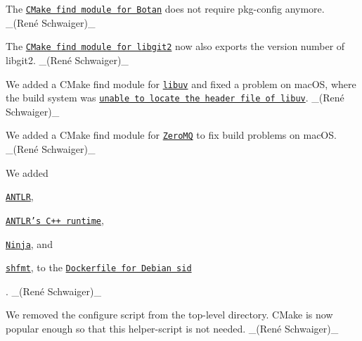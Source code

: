 \begin{DoxyItemize}
\item The \href{https://master.libelektra.org/scripts/cmake/Modules/FindLibgcrypt.cmake}{\tt C\+Make find module for Botan} does not require {\ttfamily pkg-\/config} anymore. \+\_\+(René Schwaiger)\+\_\+
\item The \href{https://master.libelektra.org/scripts/cmake/Modules/FindLibGit2.cmake}{\tt C\+Make find module for libgit2} now also exports the version number of libgit2. \+\_\+(René Schwaiger)\+\_\+
\item We added a C\+Make find module for \href{https://libuv.org}{\tt libuv} and fixed a problem on mac\+OS, where the build system was \href{https://cirrus-ci.com/task/4852008365326336}{\tt unable to locate the header file of libuv}. \+\_\+(René Schwaiger)\+\_\+
\item We added a C\+Make find module for \href{http://zeromq.org}{\tt Zero\+MQ} to fix build problems on mac\+OS. \+\_\+(René Schwaiger)\+\_\+
\end{DoxyItemize}


\begin{DoxyItemize}
\item We added
\begin{DoxyItemize}
\item \href{https://packages.debian.org/sid/antlr4}{\tt A\+N\+T\+LR},
\item \href{https://packages.debian.org/sid/libantlr4-runtime-dev}{\tt A\+N\+T\+L\+R’s C++ runtime},
\item \href{https://packages.debian.org/sid/ninja-build}{\tt Ninja}, and
\item \href{https://github.com/mvdan/sh}{\tt {\ttfamily shfmt}}, to the \href{https://master.libelektra.org/scripts/docker/debian/sid/Dockerfile}{\tt Dockerfile for Debian sid}
\end{DoxyItemize}

. \+\_\+(René Schwaiger)\+\_\+
\end{DoxyItemize}


\begin{DoxyItemize}
\item We removed the {\ttfamily configure} script from the top-\/level directory. C\+Make is now popular enough so that this helper-\/script is not needed. \+\_\+(René Schwaiger)\+\_\+
\end{DoxyItemize}


